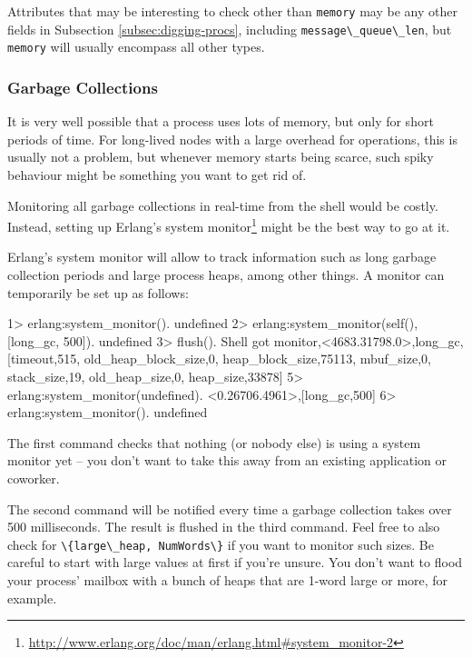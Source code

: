 \documentclass[11pt, oneside]{book}   	%
\newcommand{\expression}[1]{\Verb`#1`}
\newcommand{\term}[1]{\Verb`#1`}
\begin{document}
Attributes that may be interesting to check other than \term{memory} may be any other fields in Subsection \ref{subsec:digging-procs}, including \term{message\_queue\_len}, but \term{memory} will usually encompass all other types.

\subsubsection{Garbage Collections}

It is very well possible that a process uses lots of memory, but only for short periods of time. For long-lived nodes with a large overhead for operations, this is usually not a problem, but whenever memory starts being scarce, such spiky behaviour might be something you want to get rid of.

Monitoring all garbage collections in real-time from the shell would be costly. Instead, setting up Erlang's system monitor\footnote{\href{http://www.erlang.org/doc/man/erlang.html\#system\_monitor-2}{http://www.erlang.org/doc/man/erlang.html\#system\_monitor-2}} might be the best way to go at it.

Erlang's system monitor will allow to track information such as long garbage collection periods and large process heaps, among other things. A monitor can temporarily be set up as follows:

\begin{VerbatimEshell}
1> erlang:system_monitor().
undefined
2> erlang:system_monitor(self(), [{long_gc, 500}]).
undefined
3> flush().
Shell got {monitor,<4683.31798.0>,long_gc,
                   [{timeout,515},
                    {old_heap_block_size,0},
                    {heap_block_size,75113},
                    {mbuf_size,0},
                    {stack_size,19},
                    {old_heap_size,0},
                    {heap_size,33878}]}
5> erlang:system_monitor(undefined).
{<0.26706.4961>,[{long_gc,500}]}
6> erlang:system_monitor().
undefined
\end{VerbatimEshell}

The first command checks that nothing (or nobody else) is using a system monitor yet -- you don't want to take this away from an existing application or coworker.

The second command will be notified every time a garbage collection takes over 500 milliseconds. The result is flushed in the third command. Feel free to also check for \expression{\{large\_heap, NumWords\}} if you want to monitor such sizes.
Be careful to start with large values at first if you're unsure. You don't want to flood your process' mailbox with a bunch of heaps that are 1-word large or more, for example.
\end{document}
